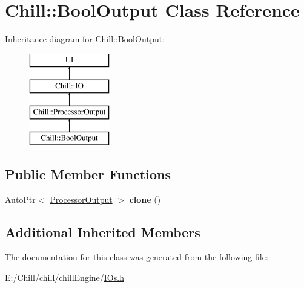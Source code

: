 \hypertarget{class_chill_1_1_bool_output}{}\section{Chill\+:\+:Bool\+Output Class Reference}
\label{class_chill_1_1_bool_output}
Inheritance diagram for Chill\+:\+:Bool\+Output\+:\begin{figure}[H]
\begin{center}
\leavevmode
\includegraphics[height=4.000000cm]{class_chill_1_1_bool_output}
\end{center}
\end{figure}
\subsection*{Public Member Functions}
\begin{DoxyCompactItemize}
\item 
\mbox{\label{class_chill_1_1_bool_output_a58f478050c8bda9d743085f69ccaa8d7}} 
Auto\+Ptr$<$ \mbox{\hyperlink{class_chill_1_1_processor_output}{Processor\+Output}} $>$ {\bfseries clone} ()
\end{DoxyCompactItemize}
\subsection*{Additional Inherited Members}


The documentation for this class was generated from the following file\+:\begin{DoxyCompactItemize}
\item 
E\+:/\+Chill/chill/chill\+Engine/\mbox{\hyperlink{_i_os_8h}{I\+Os.\+h}}\end{DoxyCompactItemize}
